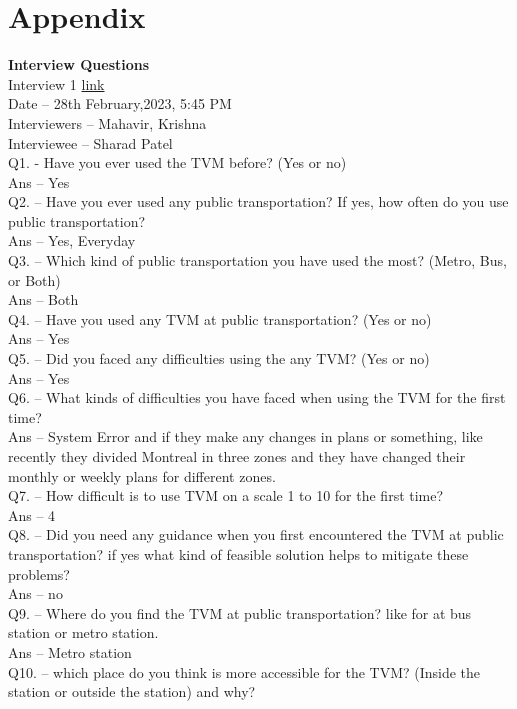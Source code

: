 \documentclass[a4paper, 11pt]{report}
\begin{document}
\chapter{Appendix}
\textbf{\LARGE{Interview Questions}}\\
Interview 1 \href{https://drive.google.com/file/d/14KPH2_q0eTWy8PQVPhdm8psBC041HXt7/view?usp=share_link}{link} \\
Date – 28th February,2023, 5:45 PM\\
Interviewers – Mahavir, Krishna\\
Interviewee – Sharad Patel\\
Q1. - Have you ever used the TVM before? (Yes or no) \\
Ans – Yes\\
Q2. – Have you ever used any public transportation? If yes, how often do you use public transportation? \\
Ans – Yes, Everyday\\
Q3. – Which kind of public transportation you have used the most? (Metro, Bus, or Both)  \\
Ans – Both\\
Q4. – Have you used any TVM at public transportation? (Yes or no) \\
Ans – Yes\\
Q5. – Did you faced any difficulties using the any TVM? (Yes or no) \\
Ans – Yes\\
Q6. – What kinds of difficulties you have faced when using the TVM for the first time? \\
Ans – System Error and if they make any changes in plans or something, like recently they divided Montreal in three zones and they have changed their monthly or weekly plans for different zones. \\
Q7. – How difficult is to use TVM on a scale 1 to 10 for the first time? \\
Ans – 4\\
Q8. – Did you need any guidance when you first encountered the TVM at public transportation? if yes what kind of feasible solution helps to mitigate these problems? \\
Ans – no\\
Q9. – Where do you find the TVM at public transportation? like for at bus station or metro station. \\
Ans – Metro station\\
Q10. – which place do you think is more accessible for the TVM? (Inside the station or outside the station) and why? \\
\end{document}
